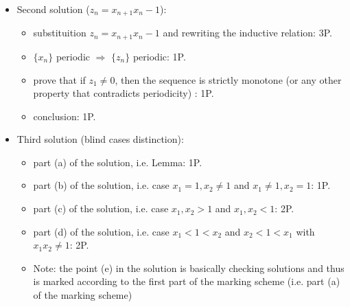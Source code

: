 {\begin{enumerate}
\begin{itemize}
\begin{itemize}
        Note: only one of the cases ($y_1>1$ or $y_1<1$) gives one point.
        \item conclusion: 1P.
    \end{itemize}
    \item Second solution ($z_n=x_{n+1}x_n-1$):
    \begin{itemize}
        \item substituition $z_n=x_{n+1}x_n-1$ and rewriting the inductive relation: 3P.
        \item $\{x_n\}$ periodic $\Rightarrow$ $\{z_n\}$ periodic: 1P.
        \item prove that if $z_1\neq 0$, then the sequence is strictly monotone (or any other property that contradicts periodicity) : 1P. 
        \item conclusion: 1P.
    \end{itemize}
    \item Third solution (blind cases distinction):
    \begin{itemize}
        \item part (a) of the solution, i.e. Lemma: 1P.
        \item part (b) of the solution, i.e. case $x_1=1,x_2\neq 1$ and $x_1\neq 1,x_2=1$: 1P.
        \item part (c) of the solution, i.e. case $x_1,x_2>1$ and $x_1,x_2<1$: 2P.
        \item part (d) of the solution, i.e. case $x_1<1<x_2$ and $x_2<1<x_1$ with $x_1x_2\neq 1$: 2P.
        \item Note: the point (e) in the solution is basically checking solutions and thus is marked according to the first part of the marking scheme (i.e. part (a) of the marking scheme)
    \end{itemize}
    \end{itemize}
\end{enumerate}
}